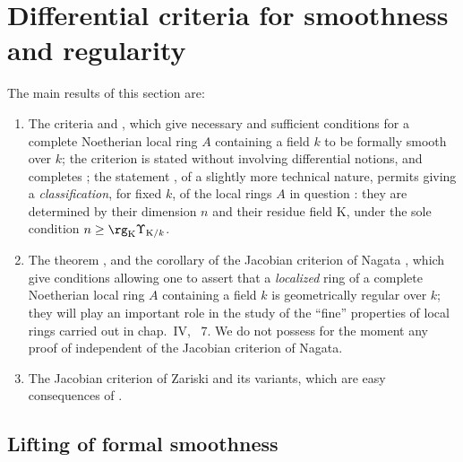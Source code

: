 \section{Differential criteria for smoothness and regularity}
\label{section:0.22}

The main results of this section are:
\begin{enumerate}
  \item[a)] The criteria  and , which give necessary and sufficient conditions for a complete Noetherian local ring $A$ containing a field $k$ to be formally smooth over $k$; the criterion  is stated without involving differential notions, and completes ; the statement , of a slightly more technical nature, permits giving a \emph{classification}, for fixed $k$, of the local rings $A$ in question : they are determined by their dimension $n$ and their residue field $\mathrm{K}$, under the sole condition $n\geq\rg_\mathrm{K}\Upsilon_{\mathrm{K}/k}$.
  \item[b)] The theorem , and the corollary  of the Jacobian criterion of Nagata , which give conditions allowing one to assert that a \emph{localized} ring of a complete Noetherian local ring $A$ containing a field $k$ is geometrically regular over $k$; they will play an important role in the study of the ``fine'' properties of local rings carried out in chap.~IV, \textsection~7. We do not possess for the moment any proof of  independent of the Jacobian criterion of Nagata.
  \item[c)] The Jacobian criterion of Zariski  and its variants, which are easy consequences of .
\end{enumerate}

\subsection{Lifting of formal smoothness}
\label{subsection:0.22.1}

